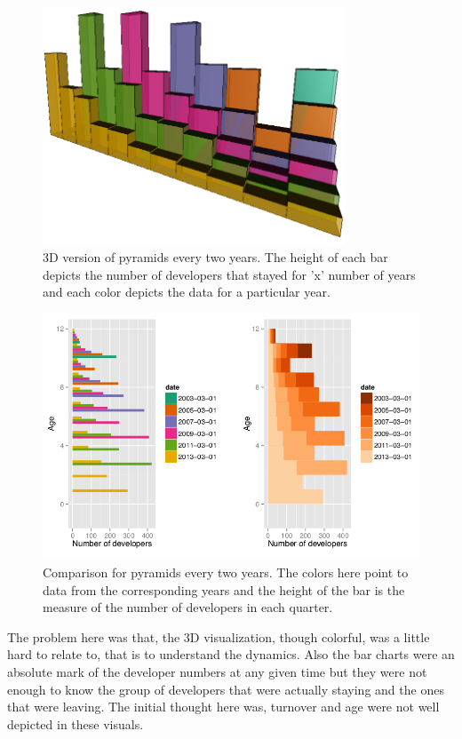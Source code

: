 \documentclass[seploa]{beavtex}
\begin{document}
\begin{figure}[!ht]
\centering
\includegraphics[width=90mm]{age2.png}
\caption{3D version of pyramids every two years. The height of each bar depicts the number of developers that stayed for 'x' number of years and each color depicts the data for a particular year.}
\end{figure}

\begin{figure}[!ht]
\centering
\includegraphics[width=130mm]{age1.png}
\caption{Comparison for pyramids every two years. The colors here point to data from the corresponding years and the height of the bar is the measure of the number of developers in each quarter.}
\end{figure}

The problem here was that, the 3D visualization, though colorful, was a little hard to relate to, that is to understand the dynamics. Also the bar charts were an absolute mark of the developer numbers at any given time but they were not enough to know the group of developers that were actually staying and the ones that were leaving. The initial thought here was, turnover and age were not well depicted in these visuals.
\end{document}
